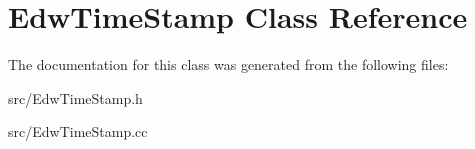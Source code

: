 \hypertarget{class_edw_time_stamp}{
\section{EdwTimeStamp Class Reference}
\label{class_edw_time_stamp}
}


The documentation for this class was generated from the following files:\begin{DoxyCompactItemize}
\item 
src/EdwTimeStamp.h\item 
src/EdwTimeStamp.cc\end{DoxyCompactItemize}
